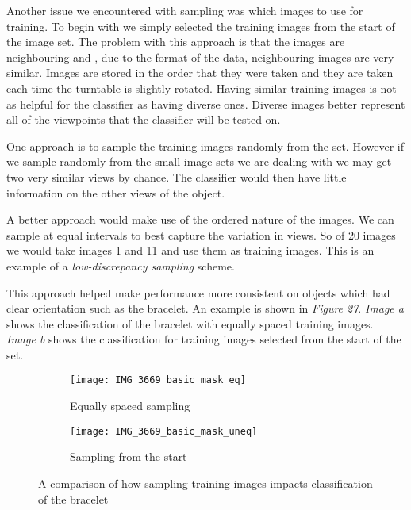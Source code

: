 \documentclass[12pt]{IIBproject}
\begin{document}
Another issue we encountered with sampling was which images to use for training. To begin with we simply selected the training images from the start of the image set. The problem with this approach is that the images are neighbouring and , due to the format of the data, neighbouring images are very similar. Images are stored in the order that they were taken and they are taken each time the turntable is slightly rotated. Having similar training images is not as helpful for the classifier as having diverse ones. Diverse images better represent all of the viewpoints that the classifier will be tested on. 

One approach is to sample the training images randomly from the set. However if we sample randomly from the small image sets we are dealing with we may get two very similar views by chance. The classifier would then have little information on the other views of the object. 

A better approach would make use of the ordered nature of the images. We can sample at equal intervals to best capture the variation in views. So of 20 images we would take images 1 and 11 and use them as training images. This is an example of a \emph{low-discrepancy sampling} scheme.

This approach helped make performance more consistent on objects which had clear orientation such as the bracelet. An example is shown in \emph{Figure 27}. \emph{Image a} shows the classification of the bracelet with equally spaced training images. \emph{Image b} shows the classification for training images selected from the start of the set. 
\begin{figure}[H]
\centering
\begin{subfigure}{.45\textwidth}
  \centering
  \texttt{[image: IMG\_3669\_basic\_mask\_eq]}
  \caption{Equally spaced sampling}
  \label{fig:sub2}
\end{subfigure}
\begin{subfigure}{.45\textwidth}
  \centering
  \texttt{[image: IMG\_3669\_basic\_mask\_uneq]}
  \caption{Sampling from the start}
  \label{fig:sub1}
\end{subfigure}%


\caption{A comparison of how sampling training images impacts classification of the bracelet}
\label{fig:test}
\end{figure}
\end{document}
